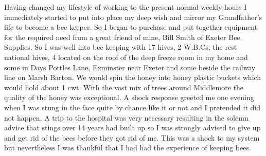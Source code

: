 Having changed my lifestyle of working to the present normal
weekly hours I immediately started to put into place my deep wish and mirror my
Grandfather's life to become a bee keeper. So I began to purchase and put
together equipment for the required need from a great friend of mine, Bill
Smith of Exeter Bee Supplies. So I was well into bee keeping with 17 hives, 2
W.B.Cs, the rest national hives, 4 located on the roof of the deep freeze room
in my home and some in Days Pottles Lane, Exminster near Exeter and some beside
the railway line on Marsh Barton. We would spin the honey into honey plastic
buckets which would hold about 1 cwt. With the vast mix of trees around
Middlemore the quality of the honey was exceptional.
A shock response greeted me one evening when I was stung in the face quite by
chance like it or not and I pretended it did not happen. A trip to the
hospital was very necessary resulting in the solemn advice that stings over 14
years had built up so I was strongly advised to give up and get rid of the bees
before they got rid of me. This was a shock to my system but nevertheless I
was thankful that I had had the experience of keeping bees.

